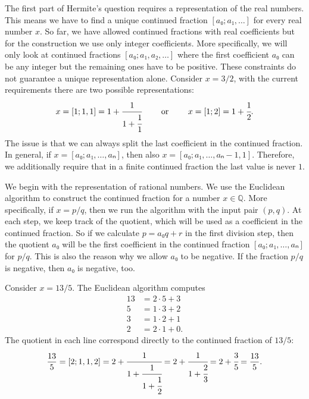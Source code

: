 The first part of Hermite's question requires a representation of the real numbers.
This means we have to find a unique continued fraction $[a₀; a₁, …]$ for every real number $x$.
So far, we have allowed continued fractions with real coefficients
but for the construction we use only integer coefficients.
More specifically, we will only look at continued fractions $[a₀; a₁, a₂, …]$
where the first coefficient $a₀$ can be any integer but the remaining ones have to be positive.
These constraints do not guarantee a unique representation alone.
Consider $x = 3/2$, with the current requirements there are two possible representations:
\[
  x = [1; 1, 1] = 1 + \cfrac{1}{1 + \cfrac{1}{1}} \qquad \text{ or } \qquad x = [1; 2] = 1 + \cfrac{1}{2}.
\]
The issue is that we can always split the last coefficient in the continued fraction.
In general, if $x = [a₀; a₁, …, aₙ]$, then also $x = [a₀; a₁, …, aₙ - 1, 1]$.
Therefore, we additionally require that in a finite continued fraction the last value is never $1$.

We begin with the representation of rational numbers.
We use the Euclidean algorithm to construct the continued fraction for a number $x ∈ ℚ$.
More specifically, if $x = p/q$, then we run the algorithm with the input pair $(p, q)$.
At each step, we keep track of the quotient,
which will be used as a coefficient in the continued fraction.
So if we calculate $p = a₀q + r$ in the first division step, then the quotient $a₀$ will be
the first coefficient in the continued fraction $[a₀; a₁, …, aₙ]$ for $p/q$.
This is also the reason why we allow $a₀$ to be negative.
If the fraction $p/q$ is negative, then $a₀$ is negative, too.

\begin{example}
  \label{ex:euclidean-cf}
  Consider $x = 13/5$.
  The Euclidean algorithm computes
  \begin{align*}
    13 & = 2 · 5 + 3 \\
     5 & = 1 · 3 + 2 \\
     3 & = 1 · 2 + 1 \\
     2 & = 2 · 1 + 0.
  \end{align*}
  The quotient in each line correspond directly to the continued fraction of $13/5$:
  \[
    \frac{13}{5}
    = [2; 1, 1, 2]
    = 2 + \cfrac{1}{1 + \cfrac{1}{1 + \cfrac{1}{2}}}
    = 2 + \cfrac{1}{1 + \cfrac{2}{3}}
    = 2 + \cfrac{3}{5}
    = \frac{13}{5}.
  \]
\end{example}

